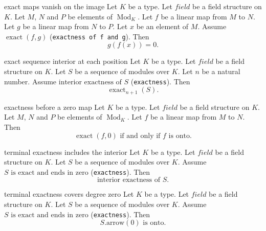 \begin{cleanresult}{exact maps vanish on the image}
Let $K$ be a type.
Let $\mathit{field}$ be a field structure on $K$.
Let $M$, $N$ and $P$ be elements of $\operatorname{Mod}_{K}$.
Let $f$ be a linear map from $M$ to $N$.
Let $g$ be a linear map from $N$ to $P$.
Let $x$ be an element of $M$.
Assume $\operatorname{exact}(f,g)$ (\texttt{exactness of f and g}).
Then \[g(f(x))=0.\]
\end{cleanresult}

\begin{cleanresult}{exact sequence interior at each position}
Let $K$ be a type.
Let $\mathit{field}$ be a field structure on $K$.
Let $S$ be a sequence of modules over $K$.
Let $n$ be a natural number.
Assume $\text{interior exactness of }S$ (\texttt{exactness}).
Then \[\operatorname{exact}_{n+1}(S).\]
\end{cleanresult}

\begin{cleanresult}{exactness before a zero map}
Let $K$ be a type.
Let $\mathit{field}$ be a field structure on $K$.
Let $M$, $N$ and $P$ be elements of $\operatorname{Mod}_{K}$.
Let $f$ be a linear map from $M$ to $N$.
Then \[\operatorname{exact}(f,0)\text{ if and only if }f\text{ is onto}.\]
\end{cleanresult}

\begin{cleanresult}{terminal exactness includes the interior}
Let $K$ be a type.
Let $\mathit{field}$ be a field structure on $K$.
Let $S$ be a sequence of modules over $K$.
Assume $S\text{ is exact and ends in zero}$ (\texttt{exactness}).
Then \[\text{interior exactness of }S.\]
\end{cleanresult}

\begin{cleanresult}{terminal exactness covers degree zero}
Let $K$ be a type.
Let $\mathit{field}$ be a field structure on $K$.
Let $S$ be a sequence of modules over $K$.
Assume $S\text{ is exact and ends in zero}$ (\texttt{exactness}).
Then \[S.\mathrm{arrow}(0)\text{ is onto}.\]
\end{cleanresult}

